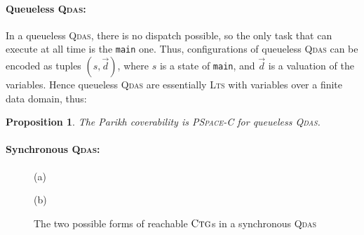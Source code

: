\documentclass[runningheads,oribibl,]{article}
\newcommand{\lts}{\textsc{Lts}\xspace}
\newcommand{\qdas}{\textsc{Qdas}\xspace}
\newcommand{\pspacecomplete}{\textsc{PSpace-C}\xspace}
\newcommand{\Data}{\ensuremath{\vec{d}}}
\newcommand{\ctg}{\ensuremath{\textsc{Ctg}}\xspace}
\newtheorem{proposition}{Proposition}{}
\begin{document}
\paragraph{\bf Queueless \qdas:} In a queueless \qdas, there is no dispatch
possible, so the only task that can execute at all time is the
\texttt{main} one. Thus, configurations of queueless \qdas can be
encoded as tuples $(s,\Data)$, where $s$ is a state of
\texttt{main}, and $\Data$ is a valuation of the variables.
Hence queueless \qdas are essentially \lts with variables over
a finite data domain, thus:
\begin{proposition}\label{prop:queueless}
  The Parikh coverability is \pspacecomplete
  for queueless \qdas.
\end{proposition}

\paragraph{\bf Synchronous \qdas:}

\begin{figure}[!t]
  \centering(a)
  \hspace*{1cm}(b)
  \caption{The two possible forms of reachable {\ctg}s in a synchronous \qdas}
  \label{fig:config-sync}
\end{figure}
\end{document}
